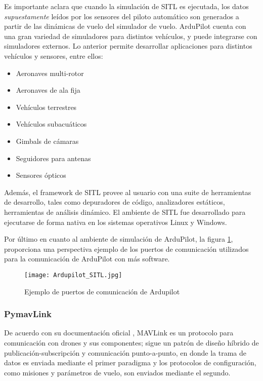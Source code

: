 Es importante aclara que cuando la simulación de SITL es ejecutada, los datos \textit{supuestamente} leídos por los sensores del piloto automático son generados a partir de las dinámicas de vuelo del simulador de vuelo. ArduPilot cuenta con una gran variedad de simuladores para distintos vehículos, y puede integrarse con simuladores externos. Lo anterior permite desarrollar aplicaciones para distintos vehículos y sensores, entre ellos: 

\begin{itemize}
    \item Aeronaves multi-rotor
    \item Aeronaves de ala fija
    \item Vehículos terrestres
    \item Vehículos subacuáticos
    \item Gimbals de cámaras
    \item Seguidores para antenas
    \item Sensores ópticos
\end{itemize}

Además, el framework de SITL provee al usuario con una suite de herramientas de desarrollo, tales como depuradores de código, analizadores estáticos, herramientas de análisis dinámico. El ambiente de SITL fue desarrollado para ejecutarse de forma nativa en los sistemas operativos Linux y Windows.

Por último en cuanto al ambiente de simulación de ArduPilot, la figura \ref{Ardupilot_SITL}, proporciona una perspectiva ejemplo de los puertos de comunicación utilizados para la comunicación de ArduPilot con más software.

\begin{figure}[ht]
    \centering
    \texttt{[image: Ardupilot\_SITL.jpg]}
    \caption{Ejemplo de puertos de comunicación de Ardupilot}
    \label{Ardupilot_SITL}
\end{figure}

\subsubsection{PymavLink}

De acuerdo con su documentación oficial \cite{MAVLink}, MAVLink es un protocolo para comunicación con drones y sus componentes; sigue un patrón de diseño híbrido de publicación-subscripción y comunicación punto-a-punto, en donde la trama de datos es enviada mediante el primer paradigma y los protocolos de configuración, como misiones y parámetros de vuelo, son enviados mediante el segundo.

